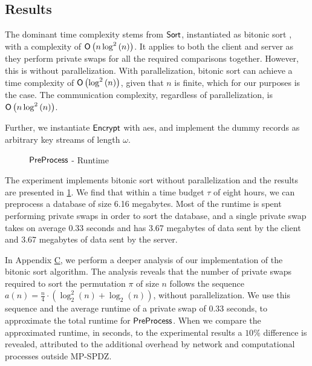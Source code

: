 \subsection*{\thesubsection\quad Results}\label{subsec:DatabaseInitResults}

The dominant time complexity stems from $ \mathsf{{Sort}} $, instantiated as bitonic sort \cite{Batcher68} , with a complexity of $ \mathsf{{O}} \left(n \log^2 \left( n \right)\right) $. It applies to both the client and server as they perform private swaps for all the required comparisons together. However, this is without parallelization. With parallelization, bitonic sort can achieve a time complexity of $ \mathsf{{O}} \left(\log^2 \left( n \right)\right) $, given that $ n $ is finite, which for our purposes is the case. The communication complexity, regardless of parallelization, is $ \mathsf{{O}} \left(n \log^2 \left( n \right)\right) $.

Further, we instantiate $ \mathsf{{Encrypt}} $ with \acrshort{aes}, and implement the dummy records as arbitrary key streams of length $ \omega $. 

\begin{figure}[H]
    \caption{$ \mathsf{{PreProcess}} $ - Runtime}
    \label{fig:preprocessRuntime}
    \centering
\end{figure}

The experiment implements bitonic sort without parallelization and the results are presented in \cref{fig:preprocessRuntime}. We find that within a time budget $  \tau $ of eight hours, we can preprocess a database of size 6.16 megabytes. Most of the runtime is spent performing private swaps in order to sort the database, and a single private swap takes on average 0.33 seconds and has 3.67 megabytes of data sent by the client and 3.67 megabytes of data sent by the server. 

In Appendix \hyperref[apx:bitonicsortanalysis]{C}, we perform a deeper analysis of our implementation of the bitonic sort algorithm. The analysis reveals that the number of private swaps required to sort the permutation $ \pi $ of size $ n $ follows the sequence $ a(n) = \frac{n}{4} \cdot \left( \log^2_2 \left( n \right) + \log_2 \left( n \right) \right) $, without parallelization. We use this sequence and the average runtime of a private swap of 0.33 seconds, to approximate the total runtime for $ \mathsf{{PreProcess}} $. When we compare the approximated runtime, in seconds, to the experimental results a $ 10\% $ difference is revealed, attributed to the additional overhead by network and computational processes outside MP-SPDZ. 

